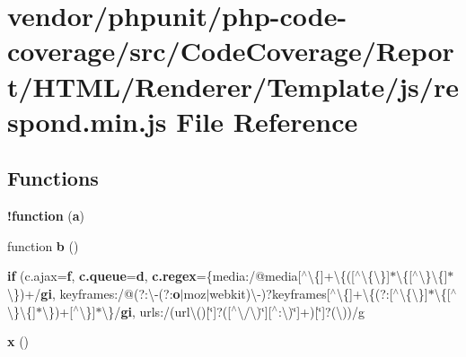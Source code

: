 \section{vendor/phpunit/php-\/code-\/coverage/src/\+Code\+Coverage/\+Report/\+H\+T\+M\+L/\+Renderer/\+Template/js/respond.min.\+js File Reference}
\label{respond_8min_8js}
\subsection*{Functions}
\begin{DoxyCompactItemize}
\item 
{\bf !function} ({\bf a})
\item 
function {\bf b} ()
\item 
{\bf if} (c.\+ajax={\bf f}, {\bf c.\+queue}={\bf d}, {\bf c.\+regex}=\{media\+:/@media[$^\wedge$\textbackslash{}\{]+\textbackslash{}\{([$^\wedge$\textbackslash{}\{\textbackslash{}\}]$\ast$\textbackslash{}\{[$^\wedge$\textbackslash{}\}\textbackslash{}\{]$\ast$\textbackslash{}\})+/{\bf gi}, keyframes\+:/@(?\+:\textbackslash{}-\/(?\+:{\bf o}$\vert$moz$\vert$webkit)\textbackslash{}-\/)?keyframes[$^\wedge$\textbackslash{}\{]+\textbackslash{}\{(?\+:[$^\wedge$\textbackslash{}\{\textbackslash{}\}]$\ast$\textbackslash{}\{[$^\wedge$\textbackslash{}\}\textbackslash{}\{]$\ast$\textbackslash{}\})+[$^\wedge$\textbackslash{}\}]$\ast$\textbackslash{}\}/{\bf gi}, urls\+:/(url\textbackslash{}()[\textquotesingle{}\char`\"{}]?([$^\wedge$\textbackslash{}/\textbackslash{})\textquotesingle{}\char`\"{}][$^\wedge$\+:\textbackslash{})\textquotesingle{}\char`\"{}]+)[\textquotesingle{}\char`\"{}]?(\textbackslash{}))/g
\item 
{\bf x} ()
\end{DoxyCompactItemize}
